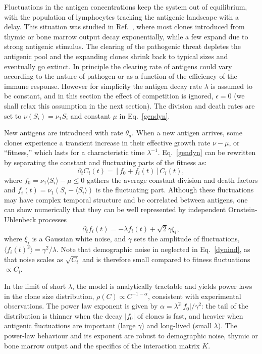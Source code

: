 \documentclass[aps,pre,twocolumn,superscriptaddress,groupedaddress]{revtex4}
\newcommand{\beq}{\begin{equation}}
\newcommand{\eeq}{\end{equation}}
\newcommand{\<}{\langle}
\renewcommand{\>}{\rangle}
\begin{document}
Fluctuations in the antigen concentrations keep the system out of equilibrium, with the population of lymphocytes tracking the antigenic landscape with a delay. This situation was studied in Ref.~\cite{desponds2016}, where most clones introduced from thymic or bone marrow output decay exponentially, while a few expand due to strong antigenic stimulus. The clearing of the pathogenic threat depletes the antigenic pool and the expanding clones  shrink back to typical sizes and eventually go extinct. In principle the clearing rate of antigens could vary according to the nature of pathogen or as a function of the efficiency of the immune response. However for simplicity the antigen decay rate $\lambda$ is assumed to be constant, and in this section the effect of competition is ignored, $\epsilon=0$ (we shall relax this assumption in the next section). The division and death rates are set to $\nu(S_i)=\nu_1 S_i$ and constant $\mu$ in Eq.~\ref{gendyn}.

New antigens are introduced with rate $\theta_a$. When a new antigen arrives, some clones experience a transient increase in their effective growth rate $\nu-\mu$, or ``fitness,'' which lasts for a characteristic time $\lambda^{-1}$. Eq.~\ref{gendyn} can be rewritten by separating the constant and fluctuating parts of the fitness as:
\beq
\partial_t C_i(t) = [f_0 +f_i(t)] C_i(t),
\label{dynind}
\eeq
where $f_0=\nu_1\<S_i\>-\mu \leq 0$ gathers the average constant division and death factors and $f_i(t)=\nu_1(S_i-\<S_i\>)$ is the fluctuating part. Although these fluctuations may have complex temporal structure and be correlated between antigens, one can show numerically that they can be well represented by independent Ornstein-Uhlenbeck processes
\beq
\partial_t f_i(t) = -\lambda f_i(t) + \sqrt{2} \gamma \xi_i,
\eeq
where $\xi_i$ is a Gaussian white noise, and
$\gamma$ sets the amplitude of fluctuations, $\<f_i(t)^2\>=\gamma^2/\lambda$. Note that demographic noise in neglected in Eq.~\ref{dynind}, as that noise scales as $\sqrt{C_i}$ and is therefore small compared to fitness fluctuations $\propto C_i$.

In the limit of short $\lambda$, the model is analytically tractable and yields power laws in the clone size distribution, $\rho(C)\propto C^{-1-\alpha}$, consistent with experimental observations. The power law exponent is given by $\alpha=\lambda^2 |f_0|/\gamma^2$: the tail of the distribution is thinner when the decay $|f_0|$ of clones is fast, and heavier when antigenic fluctuations are important (large $\gamma$) and long-lived (small $\lambda$). The power-law behaviour and its exponent are robust to demographic noise, thymic or bone marrow output and the specifics of the interaction matrix $K$.
\end{document}
